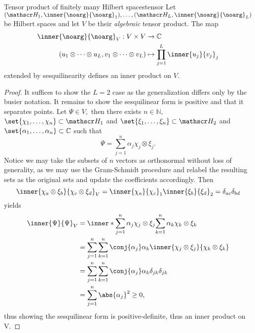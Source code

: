 \begin{proposition}{Tensor product of finitely many Hilbert spaces}{tensor}
    Let \((\hilbert_1, \inner{\noarg}{\noarg}_1), \dots, (\hilbert_L, \inner{\noarg}{\noarg}_L)\) be Hilbert spaces and let \(V\) be their \emph{algebraic} tensor product. The map
    \begin{align*}
        \inner{\noarg}{\noarg}_V : V \times V &\to \mathbb{C}\\
        (u_1 \otimes \dots \otimes u_L, v_1 \otimes \dots \otimes v_L)
                                             &\mapsto \prod_{j = 1}^L{\inner{u_j}{v_j}}_j
    \end{align*}
    extended by sesquilinearity defines an inner product on \(V.\) 
\end{proposition}
\begin{proof}
    It suffices to show the \(L = 2\) case as the generalization differs only by the busier notation. It remains to show the sesquilinear form is positive and that it separates points. Let \(\Psi \in V,\) then there exists \(n \in \mathbb{N},\) \(\set{\chi_1, \dots, \chi_n} \subset \hilbert_1\)  and \(\set{\xi_1, \dots, \xi_n} \subset \hilbert_2\) and \(\set{\alpha_1, \dots, \alpha_n} \subset \mathbb{C}\) such that
    \begin{equation*}
        \Psi = \sum_{j = 1}^n{\alpha_j \chi_j \otimes \xi_j}.
    \end{equation*}
    Notice we may take the subsets of \(n\) vectors as orthonormal without loss of generality, as we may use the Gram-Schmidt procedure and relabel the resulting sets as the original sets and update the coefficients accordingly. Then 
    \begin{equation*}
        \inner{\chi_a \otimes \xi_b}{\chi_c \otimes \xi_d}_V = \inner{\chi_a}{\chi_c}_1 \inner{\xi_b}{\xi_d}_2 = \delta_{ac} \delta_{bd}
    \end{equation*}
    yields
    \begin{align*}
        \inner{\Psi}{\Psi}_V &= \inner*{\sum_{j = 1}^n{\alpha_j \chi_j \otimes \xi_j}}{\sum_{k = 1}^n{\alpha_k \chi_k \otimes \xi_k}}\\
                             &= \sum_{j = 1}^n{\sum_{k = 1}^n{\conj{\alpha_j} \alpha_k \inner{\chi_j \otimes \xi_j}{\chi_k \otimes \xi_k}}}\\
                             &= \sum_{j= 1}^n{\sum_{k = 1}^n{\conj{\alpha_j} \alpha_k \delta_{jk} \delta_{jk}}}\\
                             &= \sum_{j = 1}^n{\abs{\alpha_j}^2}\geq 0,
    \end{align*}
    thus showing the sesquilinear form is positive-definite, thus an inner product on V.
\end{proof}


